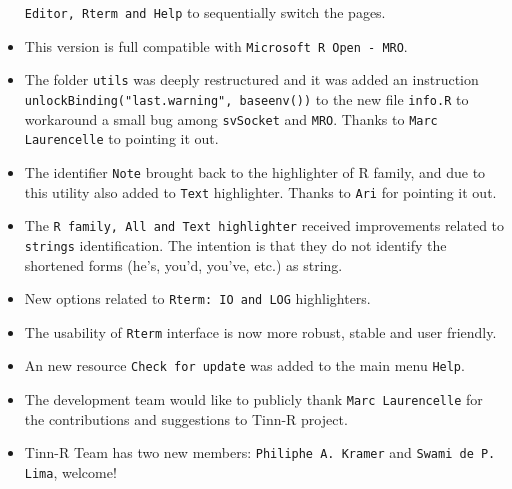 \begin{itemize}
    \texttt{Editor, Rterm and Help} to sequentially switch the pages.
  \item This version is full compatible with \texttt{Microsoft R Open - MRO}.
  \item The folder \texttt{utils} was deeply restructured and it was added an instruction \texttt{unlockBinding("last.warning", baseenv())}
    to the new file \texttt{info.R} to workaround a small bug among \texttt{svSocket} and \texttt{MRO}.
    Thanks to \texttt{Marc Laurencelle} to pointing it out.
  \item The identifier \texttt{Note} brought back to the highlighter of R family, and due to this utility also added to \texttt{Text} highlighter. Thanks to \texttt{Ari} for pointing it out.
  \item The \texttt{R family, All and Text highlighter} received improvements related to \texttt{strings} identification.
    The intention is that they do not identify the shortened forms (he's, you'd, you've, etc.) as string.
  \item New options related to \texttt{Rterm: IO and LOG} highlighters.
  \item The usability of \texttt{Rterm} interface is now more robust, stable and user friendly.
  \item An new resource \texttt{Check for update} was added to the main menu \texttt{Help}.
  \item The development team would like to publicly thank \texttt{Marc Laurencelle} for the contributions and suggestions to Tinn-R project.
  \item Tinn-R Team has two new members: \texttt{Philiphe A. Kramer} and \texttt{Swami de P. Lima}, welcome!
\end{itemize}